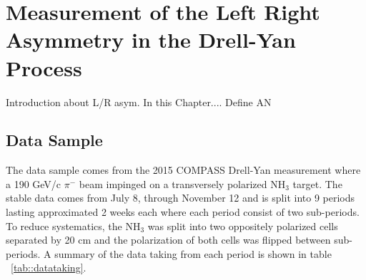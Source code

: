 \chapter{Measurement of the Left Right Asymmetry in the Drell-Yan Process} 
\label{Chap:setup}
\ifpdf
\graphicspath{{Chapters/OneCh/Figs/Raster/}{Chapters/OneCh/Figs/PDF/}{Chapters/OneCh/Figs/}}
\else \graphicspath{{Chapters/OneCh/Figs/Vector/}{Chapters/OneCh/Figs/}} \fi

Introduction about L/R asym.  In this Chapter....  Define AN

\section{Data Sample}
The data sample comes from the 2015 COMPASS Drell-Yan measurement where a 190
GeV/c $\pi^-$ beam impinged on a transversely polarized NH$_3$ target.  The
stable data comes from July 8, through November 12 and is split into 9 periods
lasting approximated 2 weeks each where each period consist of two sub-periods.
To reduce systematics, the NH$_3$ was split into two oppositely polarized cells
separated by 20 cm and the polarization of both cells was flipped between
sub-periods.  A summary of the data taking from each period is shown in table
~\ref{tab::datataking}.

